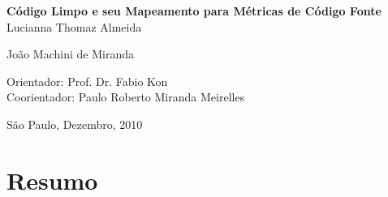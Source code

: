 \documentclass[11pt,a4paper]{book}
\begin{document}
\frontmatter 
\fancyhead[RO]{{\footnotesize\rightmark}\hspace{2em}\thepage}
\setcounter{tocdepth}{2}
\fancyhead[LE]{\thepage\hspace{2em}\footnotesize{\leftmark}}
\fancyhead[RE,LO]{}
\fancyhead[RO]{{\footnotesize\rightmark}\hspace{2em}\thepage}

\onehalfspacing  %

\thispagestyle{empty}
\begin{center}
    \vspace*{2.3cm}
    \textbf{\Large{Código Limpo e seu Mapeamento para Métricas de Código Fonte}}\\
    
    \vspace*{1.2cm}
    \Large{Lucianna Thomaz Almeida}

    \vspace*{0.5cm}
	\Large{João Machini de Miranda}
    
    
    \vskip 3.5cm
    Orientador: Prof. Dr. Fabio Kon\\
    Coorientador: Paulo Roberto Miranda Meirelles

    \vskip 1.5cm
    \normalsize{São Paulo, Dezembro, 2010}
\end{center}



\chapter*{Resumo}
\end{document}
